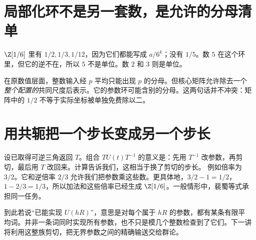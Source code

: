 \section{局部化环不是另一套数，是允许的分母清单}
$\Z[1/6]$ 里有 $1/2,1/3,1/12$，因为它们都能写成 $a/6^k$；没有 $1/5$。数 $5$ 在这个环里，但它的逆不在，所以 $5$ 不是单位。数 $2$ 和 $3$ 则是单位。

在原数值层面，整数输入经 $p$ 平均只能出现 $p$ 的分母。但核心矩阵允许除去一个\emph{整个配置的}共同尺度后表示。它的参数环可能含别的分母。这两句话并不冲突：矩阵中的 $1/2$ 不等于实际坐标被单独免费除以二。

\section{用共轭把一个步长变成另一个步长}
设已取得可逆三角返回 $T$。组合 $TU(t)T^{-1}$ 的意义是：先用 $T^{-1}$ 改参数，再剪切，最后用 $T$ 改回来。计算告诉我们，这相当于换了剪切的步长。
例如倍率为 $3/2$。它和逆倍率 $2/3$ 允许我们把参数乘这些数。更具体地，$3/2-1=1/2$，$1-2/3=1/3$，所以加法和这些倍率已经生成 $\Z[1/6]$。一般情形中，裴蜀等式承担同一任务。

到此若说“已能实现 $U(hR)$”，意思是对每个属于 $hR$ 的参数，都有某条有限平均词。并非一条词同时实现所有参数，也不只是模几个整数检查到了它们。下一讲将利用这整族剪切，把无界参数之间的精确输送交给群论。
